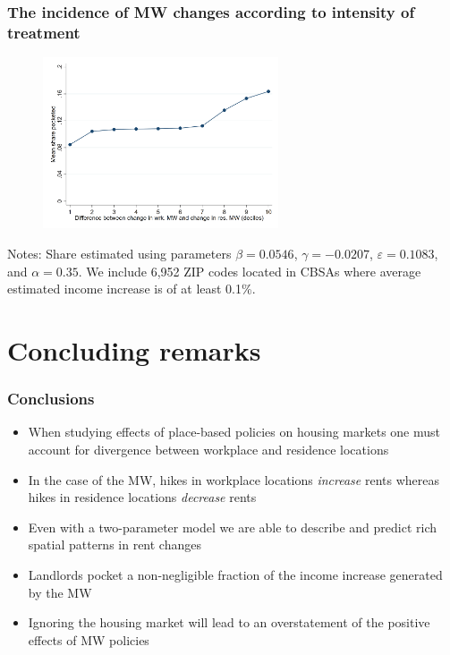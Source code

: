 \documentclass[aspectratio=169, t]{beamer}
\begin{document}
\begin{frame}
    \frametitle{The incidence of MW changes according to intensity of treatment}
    
    \begin{figure}
        \includegraphics[width = 0.62\textwidth]{counterfactuals/output/deciles_diff.png}
    \end{figure}

    \vspace{-1mm}
    \scriptsize
    Notes: Share estimated using parameters $\beta = 0.0546$, $\gamma = -0.0207$, $\varepsilon = 0.1083$, and $\alpha=0.35$.
    We include 6,952 ZIP codes located in CBSAs where average estimated income increase
    is of at least 0.1\%. 
\end{frame}

\section{Concluding remarks}

\begin{frame}
    \frametitle{Conclusions}
    
    \begin{itemize}
        \item When studying effects of place-based policies on housing markets one 
        must account for divergence between workplace and residence locations
        \vspace{2mm}
        \item In the case of the MW, hikes in workplace locations \textit{increase} rents
        whereas hikes in residence locations \textit{decrease} rents
        \vspace{2mm}
        \item Even with a two-parameter model we are able to describe and predict 
        rich spatial patterns in rent changes
        \vspace{2mm}
        \item Landlords pocket a non-negligible fraction of the income increase 
        generated by the MW
        \vspace{2mm}
        \item Ignoring the housing market will lead to an overstatement of the positive
        effects of MW policies
    \end{itemize}
    
\end{frame}
\end{document}
